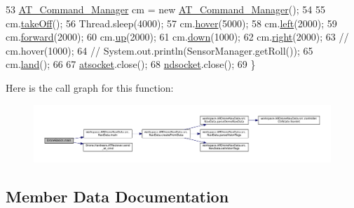 \begin{DoxyCode}
53         \hyperlink{class_drone_1_1_drone_commands_1_1_a_t___command___manager}{AT\_Command\_Manager} cm = \textcolor{keyword}{new} \hyperlink{class_drone_1_1_drone_commands_1_1_a_t___command___manager}{AT\_Command\_Manager}();
54 
55         cm.\hyperlink{class_drone_1_1_drone_commands_1_1_a_t___command___manager_a43638f032e3994903cdabd2ca611448b}{takeOff}();
56         Thread.sleep(4000);
57         cm.\hyperlink{class_drone_1_1_drone_commands_1_1_a_t___command___manager_aafd47053f06ac149caa6e349f67906fb}{hover}(5000);
58         cm.\hyperlink{class_drone_1_1_drone_commands_1_1_a_t___command___manager_a0c85483dd42046af9882d140f8eb9d12}{left}(2000);
59         cm.\hyperlink{class_drone_1_1_drone_commands_1_1_a_t___command___manager_a73bf7a9109943dceafd6ca5c7d99d47c}{forward}(2000);
60         cm.\hyperlink{class_drone_1_1_drone_commands_1_1_a_t___command___manager_a2a050072c86dfbd84ee82696b59d366e}{up}(2000);
61         cm.\hyperlink{class_drone_1_1_drone_commands_1_1_a_t___command___manager_a76f949b34a87e8577a41c02f410b97cc}{down}(1000);
62         cm.\hyperlink{class_drone_1_1_drone_commands_1_1_a_t___command___manager_a9a8b81e3c9702e2eb996283f1e441c9a}{right}(2000);
63 \textcolor{comment}{//      cm.hover(1000);}
64 \textcolor{comment}{//      System.out.println(SensorManager.getRoll());}
65         cm.\hyperlink{class_drone_1_1_drone_commands_1_1_a_t___command___manager_ada478bc35e402b7568d776616813c3a6}{land}();
66 
67         \hyperlink{class_drone_basics_adde72319658ee9fcad5d4266cf6c3ec8}{atsocket}.close();
68         \hyperlink{class_drone_basics_a7257f257caa0bb8890ec9b866dad5fdc}{ndsocket}.close();
69     \}
\end{DoxyCode}


Here is the call graph for this function\+:
\nopagebreak
\begin{figure}[H]
\begin{center}
\leavevmode
\includegraphics[width=350pt]{class_drone_basics_ae54854dcdd8fd3b84b1094fcd26a8954_cgraph}
\end{center}
\end{figure}




\subsection{Member Data Documentation}
\hypertarget{class_drone_basics_adde72319658ee9fcad5d4266cf6c3ec8}{}
